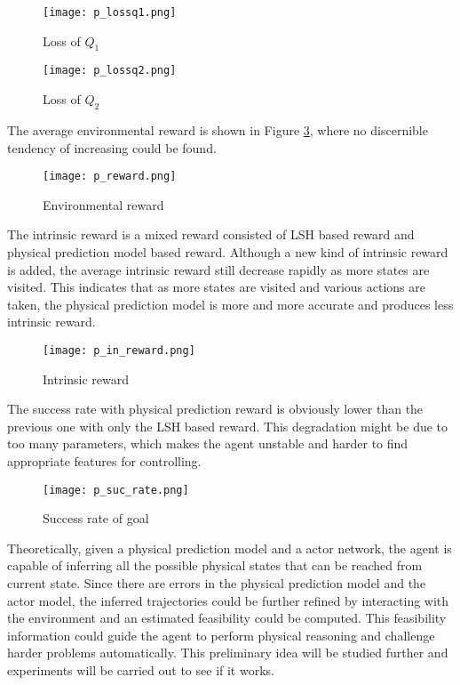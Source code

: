 \documentclass[a4paper, 12pt]{report}
\begin{document}
        \begin{figure}[H]
        \centering
        \texttt{[image: p\_lossq1.png]}
        \caption{Loss of $Q_1$}
            \label{p_lossq1}
        \end{figure}

        \begin{figure}[H]
        \centering
        \texttt{[image: p\_lossq2.png]}
        \caption{Loss of $Q_2$}
            \label{p_lossq2}
        \end{figure}

The average environmental reward is shown in Figure \ref{p_reward}, where no discernible tendency of increasing could be found.

        \begin{figure}[H]
        \centering
        \texttt{[image: p\_reward.png]}
        \caption{Environmental reward}
            \label{p_reward}
        \end{figure}

The intrinsic reward is a mixed reward consisted of LSH based reward and physical prediction model based reward. Although a new kind of intrinsic reward is added, the average intrinsic reward still decrease rapidly as more states are visited. This indicates that as more states are visited and various actions are taken, the physical prediction model is more and more accurate and produces less intrinsic reward.

        \begin{figure}[H]
        \centering
        \texttt{[image: p\_in\_reward.png]}
        \caption{Intrinsic reward}
            \label{p_in_reward}
        \end{figure}

The success rate with physical prediction reward is obviously lower than the previous one with only the LSH based reward. This degradation might be due to too many parameters, which makes the agent unstable and harder to find appropriate features for controlling.

        \begin{figure}[H]
        \centering
        \texttt{[image: p\_suc\_rate.png]}
        \caption{Success rate of goal}
        \end{figure}


Theoretically, given a physical prediction model and a actor network, the agent is capable of inferring all the possible physical states that can be reached from current state. Since there are errors in the physical prediction model and the actor model, the inferred trajectories could be further refined by interacting with the environment and an estimated feasibility could be computed. This feasibility information could guide the agent to perform physical reasoning and challenge harder problems automatically. This preliminary idea will be studied further and experiments will be carried out to see if it works.



{}

\end{document}

